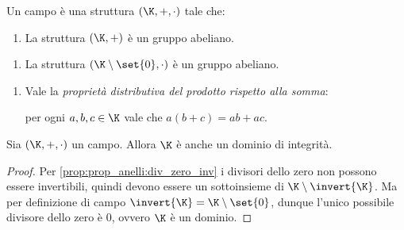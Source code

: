 \begin{remark}
    Un campo è una struttura $(\K, +, \cdot)$ tale che: 
    \begin{enumerate}[label={(S)}]
        \item La struttura $(\K, +)$ è un gruppo abeliano.
    \end{enumerate}
    \begin{enumerate}[label={(P)}]
        \item La struttura $(\K\setminus \set{0}, \cdot)$ è un gruppo abeliano.
    \end{enumerate}
    \begin{enumerate}[label=(D)]
        \item \label{def:campo:distr} Vale la \emph{proprietà distributiva del prodotto rispetto alla somma}:
         
        per ogni $a, b, c \in \K$ vale che $a(b + c) = ab + ac$.
    \end{enumerate}
\end{remark}

\begin{proposition}
     Sia $(\K, +, \cdot)$ un campo. Allora $\K$ è anche un dominio di integrità.
\end{proposition}
\begin{proof}
    Per \ref{prop:prop_anelli:div_zero_inv} i divisori dello zero non possono essere invertibili, quindi devono essere un sottoinsieme di $\K \setminus \invert{\K}$. Ma per definizione di campo $\invert{\K} = \K \setminus \set{0}$, dunque l'unico possibile divisore dello zero è $0$, ovvero $\K$ è un dominio.
\end{proof}

